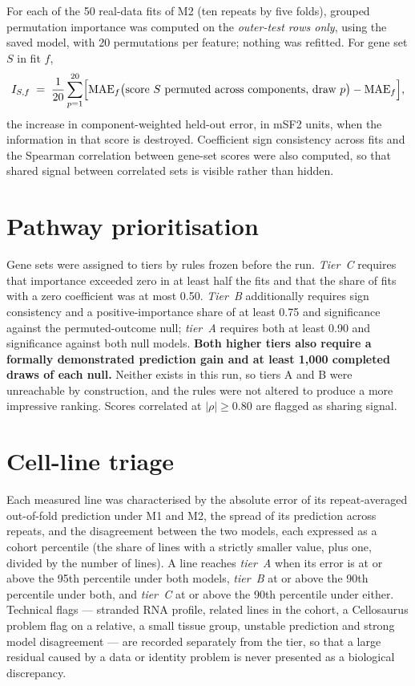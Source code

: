 For each of the 50 real-data fits of M2 (ten repeats by five folds), grouped permutation
importance was computed on the \emph{outer-test rows only}, using the saved model, with 20
permutations per feature; nothing was refitted. For gene set $S$ in fit $f$,
\begin{equation}
  I_{S,f} \;=\; \frac{1}{20}\sum_{p=1}^{20}
     \Bigl[\mathrm{MAE}_f\bigl(\text{score } S \text{ permuted across components, draw } p\bigr)
           -\mathrm{MAE}_f\Bigr],
  \label{eq:importance}
\end{equation}
the increase in component-weighted held-out error, in mSF2 units, when the information in
that score is destroyed. Coefficient sign consistency across fits and the Spearman
correlation between gene-set scores were also computed, so that shared signal between
correlated sets is visible rather than hidden.

\section{Pathway prioritisation}\label{sec:pathway-methods}

Gene sets were assigned to tiers by rules frozen before the run. \emph{Tier~C} requires that
importance exceeded zero in at least half the fits and that the share of fits with a zero
coefficient was at most 0.50. \emph{Tier~B} additionally requires sign consistency and a
positive-importance share of at least 0.75 and significance against the permuted-outcome
null; \emph{tier~A} requires both at least 0.90 and significance against both null models.
\textbf{Both higher tiers also require a formally demonstrated prediction gain and at least
1,000 completed draws of each null.} Neither exists in this run, so tiers A and B were
unreachable by construction, and the rules were not altered to produce a more impressive
ranking. Scores correlated at $\lvert\rho\rvert\ge 0.80$ are flagged as sharing signal.

\section{Cell-line triage}\label{sec:triage-methods}

Each measured line was characterised by the absolute error of its repeat-averaged
out-of-fold prediction under M1 and M2, the spread of its prediction across repeats, and
the disagreement between the two models, each expressed as a cohort percentile (the share
of lines with a strictly smaller value, plus one, divided by the number of lines). A line
reaches \emph{tier~A} when its error is at or above the 95th percentile under both models,
\emph{tier~B} at or above the 90th percentile under both, and \emph{tier~C} at or above the
90th percentile under either. Technical flags --- stranded RNA profile, related lines in the
cohort, a Cellosaurus problem flag on a relative, a small tissue group, unstable prediction
and strong model disagreement --- are recorded separately from the tier, so that a large
residual caused by a data or identity problem is never presented as a biological
discrepancy.


